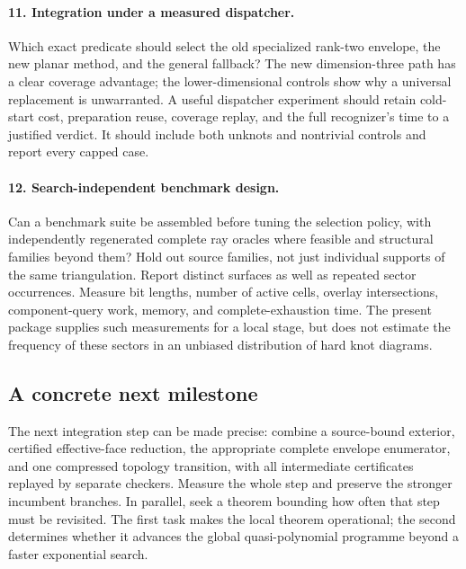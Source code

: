 \paragraph{11. Integration under a measured dispatcher.}
Which exact predicate should select the old specialized
rank-two envelope, the new planar method, and the general
fallback?  The new dimension-three path has a clear coverage
advantage; the lower-dimensional controls show why a universal
replacement is unwarranted.  A useful dispatcher experiment
should retain cold-start cost, preparation reuse, coverage
replay, and the full recognizer's time to a justified verdict.
It should include both unknots and nontrivial controls and
report every capped case.

\paragraph{12. Search-independent benchmark design.}
Can a benchmark suite be assembled before tuning the selection
policy, with independently regenerated complete ray oracles
where feasible and structural families beyond them?  Hold out
source families, not just individual supports of the same
triangulation.  Report distinct surfaces as well as repeated
sector occurrences.  Measure bit lengths, number of active
cells, overlay intersections, component-query work, memory,
and complete-exhaustion time.  The present package supplies
such measurements for a local stage, but does not estimate the
frequency of these sectors in an unbiased distribution of
hard knot diagrams.

\subsection{A concrete next milestone}

The next integration step can be made precise: combine a
source-bound exterior, certified effective-face reduction,
the appropriate complete envelope enumerator, and one
compressed topology transition, with all intermediate
certificates replayed by separate checkers.  Measure the
whole step and preserve the stronger incumbent branches.
In parallel, seek a theorem bounding how often that step
must be revisited.  The first task makes the local theorem
operational; the second determines whether it advances
the global quasi-polynomial programme beyond a faster
exponential search.
